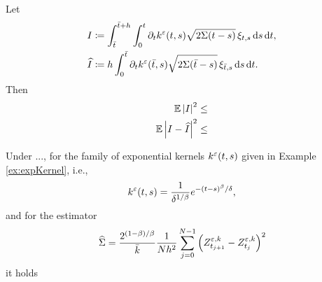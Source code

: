 \documentclass[10pt]{article}
\begin{document}
\begin{lemma}\label{lem:diffusionLemma2} Let
	\begin{equation}
	\begin{aligned}
		I &\coloneqq \int_{\bar t}^{\bar t+h} \int_0^t \partial_t k^\varepsilon(t, s) \sqrt{2\Sigma(t-s)} \, \xi_{t,s} \,\mathrm{d} s \,\mathrm{d} t, \\
		\widehat I &\coloneqq h \int_0^{\bar t} \partial_t k^\varepsilon(\bar t, s) \sqrt{2\Sigma(\bar t-s)} \, \xi_{\bar t,s} \,\mathrm{d} s \,\mathrm{d} t.
	\end{aligned}
	\end{equation}
	Then
	\begin{equation}
	\begin{aligned}
		\operatorname{\mathbb{E}}\left\lvert I\right\rvert^2 &\leq \\
		\operatorname{\mathbb{E}}\left\lvert I-\widehat I\right\rvert^2 &\leq
	\end{aligned}
	\end{equation}
\end{lemma}
\begin{proposition} Under ..., for the family of exponential kernels $k^\varepsilon(t,s)$ given in Example \ref{ex:expKernel}, i.e.,
	\begin{equation}
		k^\varepsilon(t, s) = \frac{1}{\delta^{1/\beta}} e^{-(t-s)^\beta/\delta},
	\end{equation}
	and for the estimator
	\begin{equation}
		\widehat \Sigma = \frac{2^{(1-\beta)/\beta}}{\bar k} \frac{1}{Nh^2} \sum_{j=0}^{N-1} \left(Z^{\varepsilon,k}_{t_{j+1}} - Z^{\varepsilon,k}_{t_j}\right)^2
	\end{equation}
	it holds	
\end{proposition}
\end{document}
